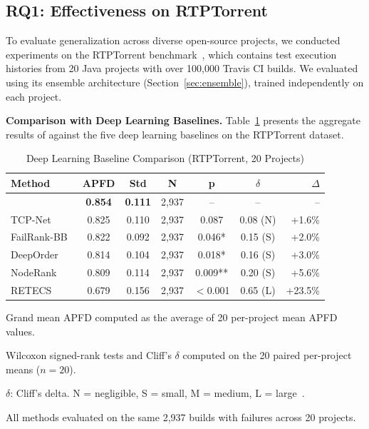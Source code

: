 
\subsection{RQ1: Effectiveness on RTPTorrent}
\label{sec:rq1_rtptorrent}

To evaluate generalization across diverse open-source projects, we
conducted experiments on the RTPTorrent benchmark~\cite{mattis2020rtptorrent},
which contains test execution histories from 20 Java projects with over 100,000
Travis CI builds. We evaluated \filopriori{} using its ensemble architecture
(Section~\ref{sec:ensemble}), trained independently on each project.

\textbf{Comparison with Deep Learning Baselines.}
Table~\ref{tab:rtptorrent_dl} presents the aggregate results of \filopriori{}
against the five deep learning baselines on the RTPTorrent dataset.

\begin{table}[!t]
\centering
\caption{Deep Learning Baseline Comparison (RTPTorrent, 20 Projects)}
\label{tab:rtptorrent_dl}
\scriptsize
\begin{tabular}{lcccccr}
\toprule
\textbf{Method} & \textbf{APFD} & \textbf{Std} & \textbf{N} & \textbf{p} & \textbf{$\delta$} & \textbf{$\Delta$} \\
\midrule
\textbf{\filopriori{}} & \textbf{0.854} & \textbf{0.111} & 2,937 & -- & -- & -- \\
TCP-Net~\cite{abdelkarim2022tcp} & 0.825 & 0.110 & 2,937 & 0.087 & 0.08 (N) & +1.6\% \\
FailRank-BB~\cite{hernandes2025method} & 0.822 & 0.092 & 2,937 & 0.046* & 0.15 (S) & +2.0\% \\
DeepOrder~\cite{chen2023deeporder} & 0.814 & 0.104 & 2,937 & 0.018* & 0.16 (S) & +3.0\% \\
NodeRank~\cite{li2024noderank} & 0.809 & 0.114 & 2,937 & 0.009** & 0.20 (S) & +5.6\% \\
RETECS~\cite{spieker2017reinforcement} & 0.679 & 0.156 & 2,937 & $<$0.001 & 0.65 (L) & +23.5\% \\
\bottomrule
\end{tabular}
\begin{tablenotes}
\small
\item Grand mean APFD computed as the average of 20 per-project mean APFD values.
\item Wilcoxon signed-rank tests and Cliff's $\delta$ computed on the 20 paired per-project means ($n = 20$).
\item $\delta$: Cliff's delta. N = negligible, S = small, M = medium, L = large~\cite{arcuri2011practical}.
\item All methods evaluated on the same 2,937 builds with failures across 20 projects.
\end{tablenotes}
\end{table}

